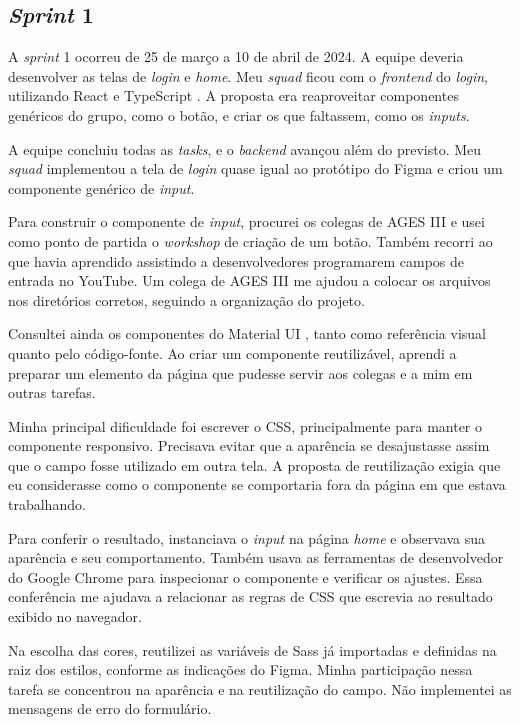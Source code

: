 \subsection{\textit{Sprint} 1}

A \textit{sprint} 1 ocorreu de 25 de março a 10 de abril de 2024. A equipe deveria desenvolver as telas de \textit{login}
e \textit{home}. Meu \textit{squad} ficou com o \textit{frontend} do
\textit{login}, utilizando React \cite{react-docs} e TypeScript
\cite{typescript-docs}. A proposta era reaproveitar componentes genéricos do
grupo, como o botão, e criar os que faltassem, como os \textit{inputs}.

A equipe concluiu todas as \textit{tasks}, e o \textit{backend} avançou além do
previsto. Meu \textit{squad} implementou a tela de \textit{login} quase igual ao
protótipo do Figma \cite{figma-help} e criou um componente genérico de
\textit{input}.

Para construir o componente de \textit{input}, procurei os colegas de AGES III
e usei como ponto de partida o \textit{workshop} de criação de um botão.
Também recorri ao que havia aprendido assistindo a desenvolvedores
programarem campos de entrada no YouTube. Um colega de AGES III me ajudou
a colocar os arquivos nos diretórios corretos, seguindo a organização do
projeto.

Consultei ainda os componentes do Material UI \cite{mui-text-field}, tanto como
referência visual quanto pelo código-fonte. Ao criar um componente
reutilizável, aprendi a preparar um elemento da página que pudesse servir
aos colegas e a mim em outras tarefas.

Minha principal dificuldade foi escrever o CSS, principalmente para manter
o componente responsivo. Precisava evitar que a aparência se desajustasse
assim que o campo fosse utilizado em outra tela. A proposta de
reutilização exigia que eu considerasse como o componente se comportaria
fora da página em que estava trabalhando.

Para conferir o resultado, instanciava o \textit{input} na página
\textit{home} e observava sua aparência e seu comportamento. Também usava
as ferramentas de desenvolvedor do Google Chrome para inspecionar o
componente e verificar os ajustes. Essa conferência me ajudava a relacionar
as regras de CSS que escrevia ao resultado exibido no navegador.

Na escolha das cores, reutilizei as variáveis de Sass já importadas e
definidas na raiz dos estilos, conforme as indicações do Figma. Minha
participação nessa tarefa se concentrou na aparência e na reutilização do
campo. Não implementei as mensagens de erro do formulário.

